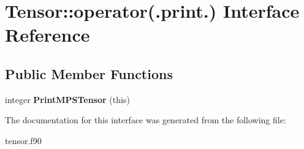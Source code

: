 \hypertarget{interface_tensor_1_1operator_07_8print_8_08}{
\section{Tensor::operator(.print.) Interface Reference}
\label{interface_tensor_1_1operator_07_8print_8_08}
}
\subsection*{Public Member Functions}
\begin{DoxyCompactItemize}
\item 
\hypertarget{interface_tensor_1_1operator_07_8print_8_08_a7df3643d1393be1567aef8f8215d8c56}{
integer {\bfseries PrintMPSTensor} (this)}
\label{interface_tensor_1_1operator_07_8print_8_08_a7df3643d1393be1567aef8f8215d8c56}

\end{DoxyCompactItemize}


The documentation for this interface was generated from the following file:\begin{DoxyCompactItemize}
\item 
tensor.f90\end{DoxyCompactItemize}
